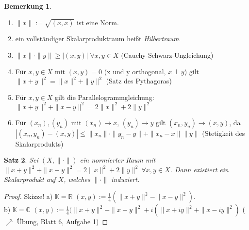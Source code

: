 \documentclass[ngerman]{report}
\theoremstyle{plain}%
\newtheorem{thm}{Satz}[chapter]
\theoremstyle{definition}%
\theoremstyle{myStyle}
\newtheorem{bem}[thm]{Bemerkung}
\newcommand{\C}{\mathbb{C}}
\newcommand{\R}{\mathbb{R}}
\newcommand{\K}{\mathbb{K}}
\newcommand{\norm}[1]{\|#1\|}
\begin{document}
	\begin{bem}
		\begin{enumerate}[1)]
			\item $\norm{x} := \sqrt{(x,x)}$ ist eine Norm.
			\item ein vollständiger Skalarproduktraum heißt \textit{Hilbertraum}.
			\item $\norm{x} \cdot \norm{y} \geq |(x,y)| \; \forall x,y \in X$ (Cauchy-Schwarz-Ungleichung)

			\item Für $x,y \in X$ mit $(x,y) = 0$ (x und y orthogonal, $x \perp y$)
			gilt $\norm{x + y}^2 = \norm{x}^2 + \norm{y}^2$ (Satz des Pythagoras)
			\item Für $x,y \in X$ gilt die Parallelogrammgleichung: 
				$\norm{x + y} ^2 + \norm{x - y}^2 = 2 \norm{x}^2 + 2\norm{y}^2$
			\item	Für $(x_n), (y_n)$ mit $(x_n) \to x$, $(y_n) \to y$ gilt 
				$(x_n, y_n) \to (x,y)$, da\\ 
				$|(x_n, y_n) - (x,y)| \leq \norm{x_n}\cdot \norm{y_n - y} + \norm{x_n - x}\norm{y}$ (Stetigkeit des Skalarprodukts)
		\end{enumerate}
	\end{bem}
	\begin{thm}
	Sei $(X,\norm{\cdot})$ ein normierter Raum mit $\norm{x+y}^2 + \norm{x-y}^2 = 2\norm{x}^2 +2\norm{y}^2 ~\forall x,y \in X$. Dann existiert ein Skalarprodukt auf $X$, welches $\norm{\cdot}$ induziert.
	\end{thm}
	\begin{proof}
		Skizze! a) $\K = \R$ $(x,y) := \frac{1}{4}(\norm{x + y}^2 - \norm{x-y}^2)$.\\ b) $\K = \C$ $(x,y) := \frac{1}{4}(\| x+y\|^2 - \|x-y\|^2 + i(\|x+iy\|^2 + \|x-iy\|^2)$ ($\nearrow$ Übung, Blatt 6, Aufgabe 1)
	\end{proof}
\end{document}
